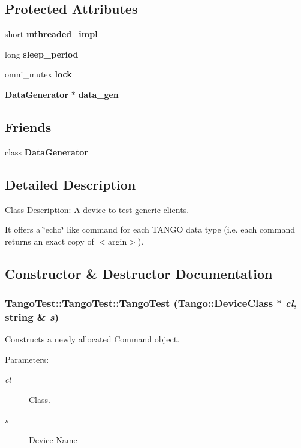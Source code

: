 \subsection*{Protected Attributes}
\begin{CompactItemize}
\item 
short {\bf mthreaded\_\-impl}
\item 
long {\bf sleep\_\-period}
\item 
omni\_\-mutex {\bf lock}
\item 
{\bf Data\-Generator} $\ast$ {\bf data\_\-gen}
\end{CompactItemize}
\subsection*{Friends}
\begin{CompactItemize}
\item 
class {\bf Data\-Generator}
\end{CompactItemize}


\subsection{Detailed Description}
Class Description: A device to test generic clients.

It offers a \char`\"{}echo\char`\"{} like command for each TANGO data type (i.e. each command returns an exact copy of $<$argin$>$). 



\subsection{Constructor \& Destructor Documentation}
\subsubsection{\setlength{\rightskip}{0pt plus 5cm}Tango\-Test::Tango\-Test::Tango\-Test (Tango::Device\-Class $\ast$ {\em cl}, string \& {\em s})}\label{classTangoTest_1_1TangoTest_z2_0}


Constructs a newly allocated Command object.

\begin{Desc}
\item[Parameters: ]\par
\begin{description}
\item[{\em 
cl}]Class. \item[{\em 
s}]Device Name \end{description}
\end{Desc}
